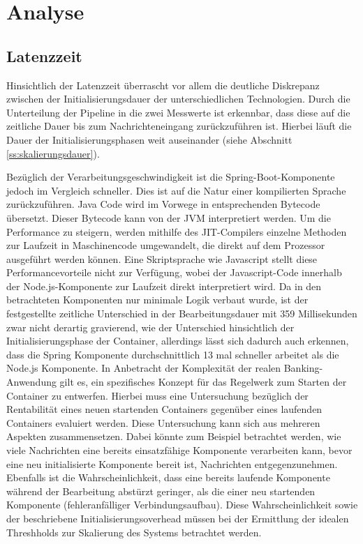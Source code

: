 \section{Analyse}


\subsection{Latenzzeit}
Hinsichtlich der Latenzzeit überrascht vor allem die deutliche Diskrepanz zwischen der Initialisierungsdauer der unterschiedlichen Technologien. Durch die Unterteilung der Pipeline in die zwei Messwerte ist erkennbar, dass diese auf die zeitliche Dauer bis zum Nachrichteneingang zurückzuführen ist. Hierbei läuft die Dauer der Initialisierungsphasen weit auseinander (siehe Abschnitt \ref{ss:skalierungsdauer}).

Bezüglich der Verarbeitungsgeschwindigkeit ist die Spring-Boot-Komponente jedoch im Vergleich schneller. Dies ist auf die Natur einer kompilierten Sprache zurückzuführen. Java Code wird im Vorwege in entsprechenden Bytecode übersetzt. Dieser Bytecode kann von der JVM interpretiert werden. Um die Performance zu steigern, werden mithilfe des JIT-Compilers einzelne Methoden zur Laufzeit in Maschinencode umgewandelt, die direkt auf dem Prozessor ausgeführt werden können. Eine Skriptsprache wie Javascript stellt diese Performancevorteile nicht zur Verfügung, wobei der Javascript-Code innerhalb der Node.js-Komponente zur Laufzeit direkt interpretiert wird. Da in den betrachteten Komponenten nur minimale Logik verbaut wurde, ist der festgestellte zeitliche Unterschied in der Bearbeitungsdauer mit 359  Millisekunden zwar nicht derartig gravierend, wie der Unterschied hinsichtlich der Initialisierungsphase der Container, allerdings lässt sich dadurch auch erkennen, dass die Spring Komponente durchschnittlich 13 mal schneller arbeitet als die Node.js Komponente. In Anbetracht der Komplexität der realen Banking-Anwendung gilt es, ein spezifisches Konzept für das Regelwerk zum Starten der Container zu entwerfen. Hierbei muss eine Untersuchung bezüglich der Rentabilität eines neuen startenden Containers gegenüber eines laufenden Containers evaluiert werden. Diese Untersuchung kann sich aus mehreren Aspekten zusammensetzen. Dabei könnte zum Beispiel betrachtet werden, wie viele Nachrichten eine bereits einsatzfähige Komponente verarbeiten kann, bevor eine neu initialisierte Komponente bereit ist, Nachrichten entgegenzunehmen. Ebenfalls ist die Wahrscheinlichkeit, dass eine bereits laufende Komponente während der Bearbeitung abstürzt geringer, als die einer neu startenden Komponente (fehleranfälliger Verbindungsaufbau). Diese Wahrscheinlichkeit sowie der beschriebene Initialisierungsoverhead müssen bei der Ermittlung der idealen Threshholds zur Skalierung des Systems betrachtet werden.

